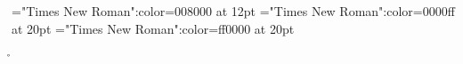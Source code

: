 \font\tctbta="Times New Roman":color=008000 at 12pt
\font\tbta="Times New Roman":color=0000ff at 20pt
\font\ta="Times New Roman":color=ff0000 at 20pt
 \r\n
{}






\bye
